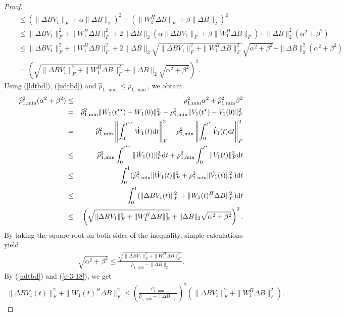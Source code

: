 \documentclass[11pt,a4paper]{article}
\numberwithin{equation}{section}
\newcommand {\wh} {\widehat}
\begin{document}
\begin{proof}
\begin{eqnarray}
&&\le (\|{\Delta BV_1}\|_F+\alpha\|{\Delta B}\|_2)^2
+(\|{W_1^H\Delta B}\|_F+\beta\|{\Delta B}\|_2)^2\nonumber\\
\nonumber
&&\le \|{\Delta BV_1}\|_F^2+\|{W_1^H\Delta B}\|_F^2+2\|{\Delta B}\|_2
(\alpha\|{\Delta BV_1}\|_F+\beta \|{W_1^H\Delta B}\|_F)+\|{\Delta B}\|_2^2(\alpha^2+\beta^2)\\
\nonumber
&&\le \|{\Delta BV_1}\|_F^2+\|{W_1^H\Delta B}\|_F^2+2\|{\Delta B}\|_2
\sqrt{\|{\Delta BV_1}\|_F^2+\|{W_1^H\Delta B}\|_F^2}\sqrt{\alpha^2+\beta^2}+\|{\Delta B}\|_2^2(\alpha^2+\beta^2)\\
\label{udtbd}
&&=\left(\sqrt{\|{\Delta BV_1}\|_F^2+\|{W_1^H\Delta B}\|_F^2}
+\|{\Delta B}\|_2\sqrt{\alpha^2+\beta^2}\right)^2.
\end{eqnarray}
Using (\ref{ldtbd}), (\ref{udtbd}) and $\wh\rho_{1,\min}\le \rho_{1,\min}$, we obtain
\begin{eqnarray*}
\wh\rho_{1,\min}^2(\alpha^2+\beta^2)&\le& \rho_{1,\min}^2\alpha^2+\wh\rho^2_{1,\min}\beta^2\nonumber\\
&=&\wh\rho_{1,\min}^2\|{W_1(t^{\star\star})-W_1(0)}\|_F^2
+\rho_{1,\min}^2\|{V_1(t^\star)-V_1(0)}\|_F^2\nonumber\\
&=&\wh\rho_{1,\min}^2\left\|\int_0^{t^{\star\star}}\dot W_1(t){\rm d}t\right\|_F^2
+\rho_{1,\min}^2\left\|\int_0^{t^\star}\dot V_1(t){\rm d}t\right\|_F^2\nonumber\\
&\le&\wh\rho_{1,\min}^2\int_0^{t^{\star\star}}\|{\dot W_1(t)}\|_F^2{\rm d}t
+\rho_{1,\min}^2\int_0^{t^{\star}}\|{\dot V_1(t)}\|_F^2{\rm d}t\nonumber\\
&\le&\int_0^{1}(\wh\rho_{1,\min}^2\|{\dot W_1(t)}\|_F^2
+\rho_{1,\min}^2\|{\dot V_1(t)}\|_F^2){\rm d}t\nonumber\\
&\le&\int_0^{1}(\|{\Delta BV_1(t)}\|_F^2+\|{W_1(t)^H\Delta B}\|_F^2){\rm d}t \nonumber\\
&\le&\left(\sqrt{\|{\Delta BV_1}\|_F^2+\|{W_1^H\Delta B}\|_F^2}
+\|{\Delta B}\|_2\sqrt{\alpha^2+\beta^2}\right)^2.
\end{eqnarray*}
By taking the square root on both sides of the inequality, simple calculations yield
\begin{eqnarray}\label{c-3-18}
\sqrt{\alpha^2+\beta^2}\le \frac{\sqrt{\|{\Delta BV_1}\|_F^2+\|{W_1^H\Delta B}\|_F^2}}
{\wh\rho_{1,\min}-\|{\Delta B}\|_2}.
\end{eqnarray}
By (\ref{udtbd}) and (\ref{c-3-18}), we get
\begin{eqnarray}\label{c-3-19}
\|{\Delta BV_1(t)}\|_F^2+
\|{W_1(t)^H\Delta B}\|_F^2\le\left(\frac{\wh \rho_{1,\min}}{\wh \rho_{1,\min}-\|{\Delta B}\|_2}\right)^2(\|{\Delta BV_1}\|_F^2+\|{W_1^H\Delta B}\|_F^2).

\end{eqnarray}
\end{proof}
\end{document}
